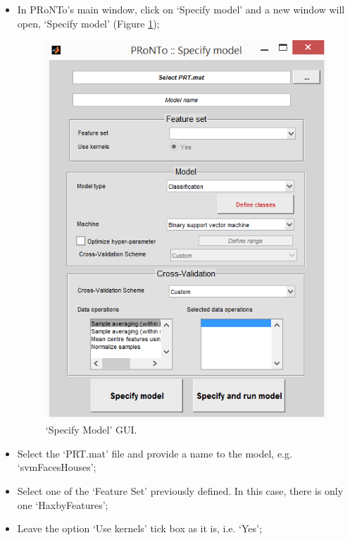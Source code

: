 \begin{itemize}
	
	\item In PRoNTo's main window, click on `Specify model' and a new window will open, `Specify model' (Figure \ref{fig:specifyModel});
	
	\begin{figure}[!h]
	\centering
		\includegraphics[scale=0.7]{images/Tutorial/classification/specifyModel.png}
	\caption{`Specify Model' GUI.}
	\label{fig:specifyModel}
\end{figure}
	
	\item Select the `PRT.mat' file and provide a name to the model, e.g. `svmFacesHouses';

	\item Select one of the `Feature Set' previously defined. In this case, there is only one `HaxbyFeatures';

	\item	Leave the option `Use kernels' tick box as it is, i.e. `Yes';


\end{itemize}
